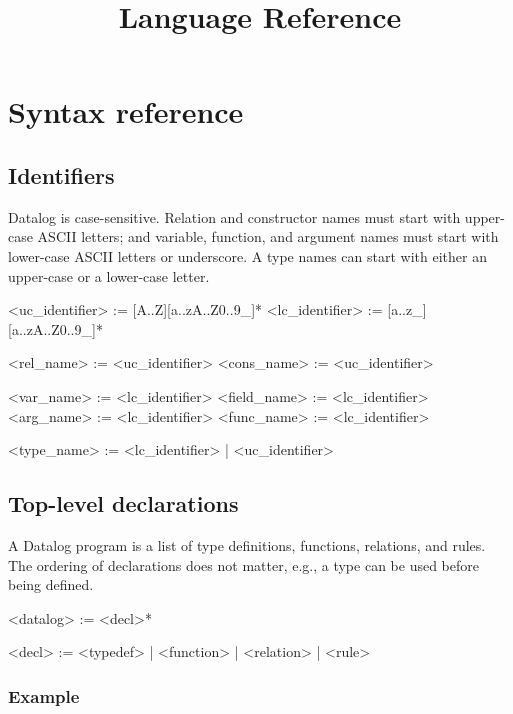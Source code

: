 \documentclass{report}
\title{\lang Language Reference}
\newcommand{\lang}{Datalog\xspace}
\begin{document}
\maketitle

\tableofcontents

\chapter{Syntax reference}\label{s:reference}

\section{Identifiers}

\lang is case-sensitive.  Relation and constructor
names must start with upper-case ASCII letters; and variable, function, 
and argument names must start with lower-case ASCII letters or
underscore.  A type names can start with either an upper-case or a lower-case letter.

\begin{bnflisting}{}
    <uc_identifier> := [A..Z][a..zA..Z0..9_]*
    <lc_identifier> := [a..z_][a..zA..Z0..9_]*

    <rel_name> := <uc_identifier>
    <cons_name> := <uc_identifier>

    <var_name> := <lc_identifier>
    <field_name> := <lc_identifier>
    <arg_name> := <lc_identifier>
    <func_name> := <lc_identifier>

    <type_name> := <lc_identifier> | <uc_identifier>
\end{bnflisting}


\section{Top-level declarations}

A \lang program is a list of type definitions, functions, relations, and rules.
The ordering of declarations does not matter, e.g., a type can be used
before being defined.

\begin{bnflisting}{}
<datalog> := <decl>*

<decl> := <typedef>
        | <function>
        | <relation>
        | <rule>
\end{bnflisting}

\subsection*{Example}
\end{document}
